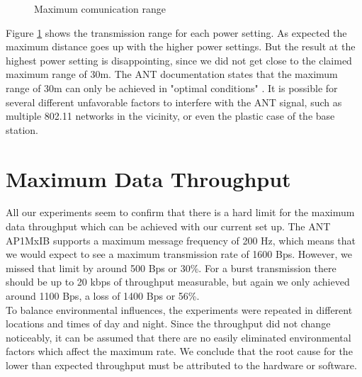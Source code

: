 \begin{description}
\begin{figure}[H]
		\caption{Maximum comunication range}\label{fig:exp6}
	\end{figure}
	Figure \ref{fig:exp6} shows the transmission range for each power setting. As expected the maximum distance goes up with the higher power settings. But the result at the highest power setting is disappointing, since we did not get close to the claimed maximum range of 30m. The ANT documentation states that the maximum range of 30m can only be achieved in "optimal conditions" \cite{DynastreamInnovationsInc.2013}. It is possible for several different unfavorable factors to interfere with the ANT signal, such as multiple 802.11 networks in the vicinity, or even the plastic case of the base station. 
\end{description}


\section{Maximum Data Throughput}
\label{sec:dataThrougput}

All our experiments seem to confirm that there is a hard limit for the maximum data throughput which can be achieved with our current set up. The ANT AP1MxIB supports a maximum message frequency of 200 Hz, which means that we would expect to see a maximum transmission rate of 1600 Bps.
 However, we missed that limit by around 500 Bps or 30\%. For a burst transmission there should be up to 20 kbps of throughput measurable, but again we only achieved around 1100 Bps, a loss of 1400 Bps or 56\%.\\
To balance environmental influences, the experiments were repeated in different locations and times of day and night. Since the throughput did not change noticeably, it can be assumed that there are no easily eliminated environmental factors which affect the maximum rate. We conclude that the root cause for the lower than expected throughput must be attributed to the hardware or software. \\

